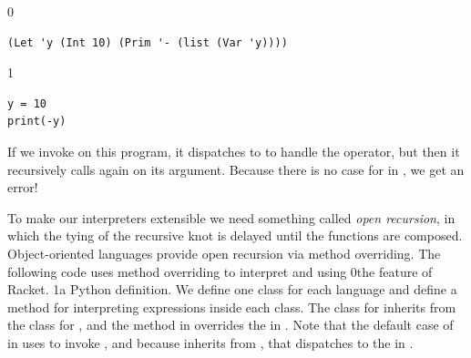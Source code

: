\documentclass[7x10]{TimesAPriori_MIT}%
\def\racketEd{0}
\def\pythonEd{1}
\def\edition{1}
\newcommand{\racket}[1]{{\if\edition\racketEd{#1}\fi}}
\newcommand{\pythonColor}[0]{}
\newcommand{\python}[1]{{\if\edition\pythonEd\pythonColor #1\fi}}
\numberwithin{theorem}{chapter}
\numberwithin{definition}{chapter}
\numberwithin{equation}{chapter}
\begin{document}
{\if\edition\racketEd
\begin{lstlisting}
(Let 'y (Int 10) (Prim '- (list (Var 'y))))
\end{lstlisting}
\fi}
{\if\edition\pythonEd\pythonColor
\begin{minipage}{0.96\textwidth}
\begin{lstlisting}
y = 10 
print(-y)
\end{lstlisting}
\end{minipage}
\fi}

\noindent If we invoke  on this program, it
dispatches to  to handle the \code{-} operator, but
then it recursively calls  again on its argument.
Because there is no case for  in , we get
an error!

To make our interpreters extensible we need something called
\emph{open recursion}, in which the
tying of the recursive knot is delayed until the functions are
composed. Object-oriented languages provide open recursion via method
overriding. The following code uses
method overriding to interpret \LangInt{} and \LangVar{} using
%
\racket{the
  \href{https://docs.racket-lang.org/guide/classes.html}{\code{class}}
  \index{subject}{class} feature of Racket.}
%
\python{a Python  definition.}
%
We define one class for each language and define a method for
interpreting expressions inside each class. The class for \LangVar{}
inherits from the class for \LangInt{}, and the method
 in \LangVar{} overrides the  in
\LangInt{}. Note that the default case of  in
\LangVar{} uses  to invoke , and because
\LangVar{} inherits from \LangInt{}, that dispatches to the
 in \LangInt{}.
\end{document}
